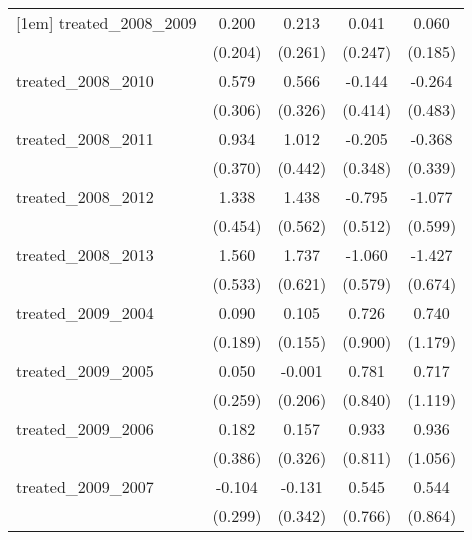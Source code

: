 {\begin{tabular}{l*{4}{c}}
[1em]
treated\_2008\_2009&       0.200         &       0.213         &       0.041         &       0.060         \\
            &     (0.204)         &     (0.261)         &     (0.247)         &     (0.185)         \\
[1em]
treated\_2008\_2010&       0.579         &       0.566         &      -0.144         &      -0.264         \\
            &     (0.306)         &     (0.326)         &     (0.414)         &     (0.483)         \\
[1em]
treated\_2008\_2011&       0.934\sym{*}  &       1.012\sym{*}  &      -0.205         &      -0.368         \\
            &     (0.370)         &     (0.442)         &     (0.348)         &     (0.339)         \\
[1em]
treated\_2008\_2012&       1.338\sym{**} &       1.438\sym{*}  &      -0.795         &      -1.077         \\
            &     (0.454)         &     (0.562)         &     (0.512)         &     (0.599)         \\
[1em]
treated\_2008\_2013&       1.560\sym{**} &       1.737\sym{**} &      -1.060         &      -1.427\sym{*}  \\
            &     (0.533)         &     (0.621)         &     (0.579)         &     (0.674)         \\
[1em]
treated\_2009\_2004&       0.090         &       0.105         &       0.726         &       0.740         \\
            &     (0.189)         &     (0.155)         &     (0.900)         &     (1.179)         \\
[1em]
treated\_2009\_2005&       0.050         &      -0.001         &       0.781         &       0.717         \\
            &     (0.259)         &     (0.206)         &     (0.840)         &     (1.119)         \\
[1em]
treated\_2009\_2006&       0.182         &       0.157         &       0.933         &       0.936         \\
            &     (0.386)         &     (0.326)         &     (0.811)         &     (1.056)         \\
[1em]
treated\_2009\_2007&      -0.104         &      -0.131         &       0.545         &       0.544         \\
            &     (0.299)         &     (0.342)         &     (0.766)         &     (0.864)         \\

\end{tabular}}
